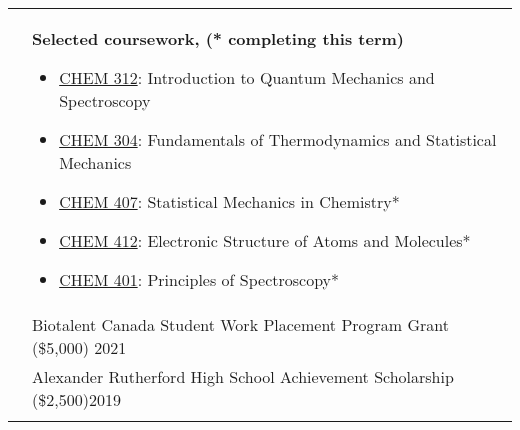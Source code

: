 \documentclass[letterpaper, 11pt]{article}
\begin{document}
\begin{longtable}{p{1.3in}p{4.8in}}
	 & \textbf{Selected coursework, (* completing this term)}
	\begin{itemize}[noitemsep,leftmargin=*]
		\item \underline{CHEM 312}: Introduction to Quantum Mechanics and Spectroscopy
		\item \underline{CHEM 304}: Fundamentals of Thermodynamics and Statistical Mechanics
		\item \underline{CHEM 407}: Statistical Mechanics in Chemistry*
		\item \underline{CHEM 412}: Electronic Structure of Atoms and Molecules*
		\item \underline{CHEM 401}: Principles of Spectroscopy*
	\end{itemize}                                                                                                                       \\



	{\color{Blue}{Honours and}}
	 & Biotalent Canada Student Work Placement Program Grant (\$5,000) \hfill 2021                                                                                                                            \\
	{\color{Blue}{Scholarships}}
	 & Alexander Rutherford High School Achievement Scholarship (\$2,500)\hfill 2019                                                                                                                          \\
	 &                                                                                                                                                                                                        \\


\end{longtable}
\end{document}
